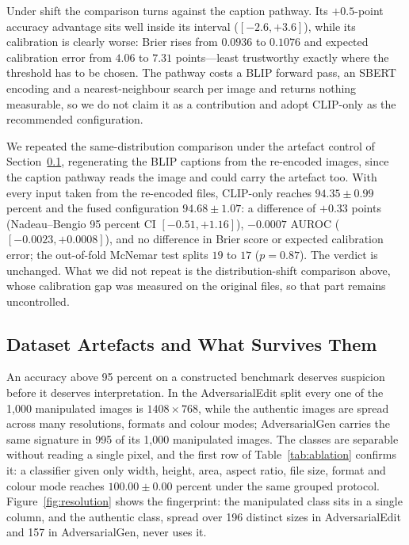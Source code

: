 \documentclass[pdflatex,sn-mathphys-num]{sn-jnl}
\begin{document}
Under shift the comparison turns against the caption pathway. Its
$+0.5$-point accuracy advantage sits well inside its interval
($[-2.6, +3.6]$), while its calibration is clearly worse: Brier rises from
$0.0936$ to $0.1076$ and expected calibration error from $4.06$ to $7.31$
points---least trustworthy exactly where the threshold has to be chosen. The
pathway costs a BLIP forward pass, an SBERT encoding and a nearest-neighbour
search per image and returns nothing measurable, so we do not claim it as a
contribution and adopt CLIP-only as the recommended configuration.

We repeated the same-distribution comparison under the artefact control of
Section~\ref{sec:artefact}, regenerating the BLIP captions from the re-encoded
images, since the caption pathway reads the image and could carry the artefact
too. With every input taken from the re-encoded files, CLIP-only reaches
$94.35 \pm 0.99$ percent and the fused configuration $94.68 \pm 1.07$: a
difference of $+0.33$ points (Nadeau--Bengio 95 percent CI $[-0.51, +1.16]$),
$-0.0007$ AUROC ($[-0.0023, +0.0008]$), and no difference in Brier score or
expected calibration error; the out-of-fold McNemar test splits $19$ to $17$
($p = 0.87$). The verdict is unchanged. What we did not repeat is the
distribution-shift comparison above, whose calibration gap was measured on the
original files, so that part remains uncontrolled.

\subsection{Dataset Artefacts and What Survives Them}
\label{sec:artefact}

An accuracy above 95 percent on a constructed benchmark deserves suspicion
before it deserves interpretation. In the AdversarialEdit split every one of
the 1{,}000 manipulated images is $1408 \times 768$, while the authentic images
are spread across many resolutions, formats and colour modes; AdversarialGen
carries the same signature in 995 of its 1{,}000 manipulated images. The
classes are separable without reading a single pixel, and the first row of
Table~\ref{tab:ablation} confirms it: a classifier given only width, height,
area, aspect ratio, file size, format and colour mode reaches
$100.00 \pm 0.00$ percent under the same grouped protocol.
Figure~\ref{fig:resolution} shows the fingerprint: the manipulated class sits in
a single column, and the authentic class, spread over 196 distinct sizes in
AdversarialEdit and 157 in AdversarialGen, never uses it.
\end{document}
